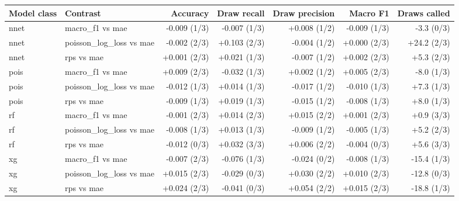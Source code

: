 
\begin{tabular}{llrrrrr}
\toprule
Model class & Contrast & Accuracy & Draw recall & Draw precision & Macro F1 & Draws called\\
\midrule
nnet & macro\_f1 vs mae & -0.009 (1/3) & -0.007 (1/3) & +0.008 (1/2) & -0.009 (1/3) & -3.3 (0/3)\\
nnet & poisson\_log\_loss vs mae & -0.002 (2/3) & +0.103 (2/3) & -0.004 (1/2) & +0.000 (2/3) & +24.2 (2/3)\\
nnet & rps vs mae & +0.001 (2/3) & +0.021 (1/3) & -0.007 (1/2) & +0.002 (2/3) & +5.3 (2/3)\\
pois & macro\_f1 vs mae & +0.009 (2/3) & -0.032 (1/3) & +0.002 (1/2) & +0.005 (2/3) & -8.0 (1/3)\\
pois & poisson\_log\_loss vs mae & -0.012 (1/3) & +0.014 (1/3) & -0.017 (1/2) & -0.010 (1/3) & +7.3 (1/3)\\
pois & rps vs mae & -0.009 (1/3) & +0.019 (1/3) & -0.015 (1/2) & -0.008 (1/3) & +8.0 (1/3)\\
rf & macro\_f1 vs mae & -0.001 (2/3) & +0.014 (2/3) & +0.015 (2/2) & +0.001 (2/3) & +0.9 (3/3)\\
rf & poisson\_log\_loss vs mae & -0.008 (1/3) & +0.013 (1/3) & -0.009 (1/2) & -0.005 (1/3) & +5.2 (2/3)\\
rf & rps vs mae & -0.012 (0/3) & +0.032 (3/3) & +0.006 (2/2) & -0.004 (0/3) & +5.6 (3/3)\\
xg & macro\_f1 vs mae & -0.007 (2/3) & -0.076 (1/3) & -0.024 (0/2) & -0.008 (1/3) & -15.4 (1/3)\\
xg & poisson\_log\_loss vs mae & +0.015 (2/3) & -0.029 (0/3) & +0.030 (2/2) & +0.010 (2/3) & -12.8 (0/3)\\
xg & rps vs mae & +0.024 (2/3) & -0.041 (0/3) & +0.054 (2/2) & +0.015 (2/3) & -18.8 (1/3)\\
\bottomrule
\end{tabular}
